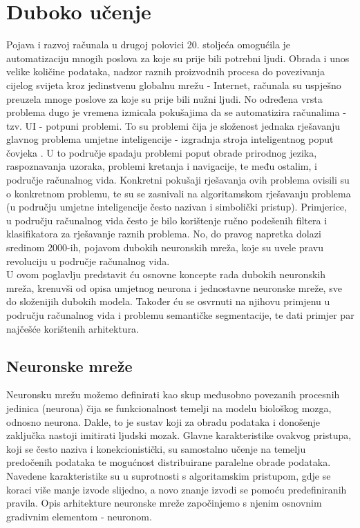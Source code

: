 \chapter{Duboko učenje}
\makeatletter
\renewcommand{\ALG@name}{Algoritam}
\makeatother



Pojava i razvoj računala u drugoj polovici 20. stoljeća omogućila je automatizaciju mnogih poslova za koje su prije bili potrebni ljudi. Obrada i unos velike količine podataka, nadzor raznih proizvodnih procesa do povezivanja cijelog svijeta kroz jedinstvenu globalnu mrežu - Internet, računala su uspješno preuzela mnoge poslove za koje su prije bili nužni ljudi. No određena vrsta problema dugo je vremena izmicala pokušajima da se automatizira računalima - tzv. UI - potpuni problemi. To su problemi čija je složenost jednaka rješavanju glavnog problema umjetne inteligencije - izgradnja stroja inteligentnog poput čovjeka \citep{uilectures}. U to područje spadaju problemi poput obrade prirodnog jezika, raspoznavanja uzoraka, problemi kretanja i navigacije, te među ostalim, i područje računalnog vida. Konkretni pokušaji rješavanja ovih problema ovisili su o konkretnom problemu, te su se zasnivali na algoritamskom rješavanju problema (u području umjetne inteligencije često nazivan i simbolički pristup). Primjerice, u području računalnog vida često je bilo korištenje ručno podešenih filtera i klasifikatora za rješavanje raznih problema. No, do pravog napretka dolazi sredinom 2000-ih, pojavom dubokih neuronskih mreža, koje su uvele pravu revoluciju u područje računalnog vida.\\

\noindent U ovom poglavlju predstavit ću osnovne koncepte rada dubokih neuronskih mreža, krenuvši od opisa umjetnog neurona i jednostavne neuronske mreže, sve do složenijih dubokih modela. Također ću se osvrnuti na njihovu primjenu u području računalnog vida i problemu semantičke segmentacije, te dati primjer par najčešće korištenih arhitektura.

\section{Neuronske mreže}

Neuronsku mrežu možemo definirati kao skup međusobno povezanih procesnih jedinica (neurona) čija se funkcionalnost temelji na modelu biološkog mozga, odnosno neurona. Dakle, to je sustav koji za obradu podataka i donošenje zaključka nastoji imitirati ljudski mozak. Glavne karakteristike ovakvog pristupa, koji se često naziva i konekcionistički, su samostalno učenje na temelju predočenih podataka te mogućnost distribuirane paralelne obrade podataka. Navedene karakteristike  su u suprotnosti s algoritamskim pristupom, gdje se koraci više manje izvode slijedno, a novo znanje izvodi se pomoću predefiniranih pravila. Opis arhitekture neuronske mreže započinjemo s njenim osnovnim gradivnim elementom - neuronom. 

